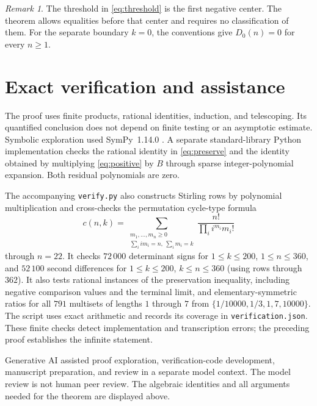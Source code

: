 \documentclass[11pt,a4paper]{article}
\theoremstyle{remark}
\newtheorem{remark}[theorem]{Remark}
\begin{document}
\begin{remark}
The threshold in \eqref{eq:threshold} is the first negative center.
The theorem allows equalities before that center and requires no
classification of them. For the separate boundary $k=0$, the conventions
give $D_0(n)=0$ for every $n\geq1$.
\end{remark}

\section{Exact verification and assistance}

The proof uses finite products, rational identities, induction, and
telescoping. Its quantified conclusion does not depend on finite testing
or an asymptotic estimate. Symbolic exploration used SymPy~1.14.0
\cite{MeurerEtAl2017}. A separate standard-library Python implementation
checks the rational identity in \eqref{eq:preserve} and the identity obtained by multiplying
\eqref{eq:positive} by $B$ through sparse integer-polynomial expansion.
Both residual polynomials are zero.

The accompanying \texttt{verify.py} also constructs Stirling rows by
polynomial multiplication and cross-checks the permutation cycle-type
formula
\[
 c(n,k)=\sum_{\substack{m_1,\ldots,m_n\geq0\\
                  \sum_i i m_i=n,\ \sum_i m_i=k}}
           \frac{n!}{\prod_i i^{m_i}m_i!}
\]
through $n=22$. It checks $72\,000$ determinant signs for
$1\leq k\leq200$, $1\leq n\leq360$, and $52\,100$ second differences
for $1\leq k\leq200$, $k\leq n\leq360$ (using rows through $362$).
It also tests rational instances of the preservation inequality, including
negative comparison values and the terminal limit, and elementary-symmetric
ratios for all $791$ multisets of lengths $1$ through $7$ from
$\{1/10000,1/3,1,7,10000\}$. The script uses exact arithmetic and records
its coverage in \texttt{verification.json}. These finite checks detect
implementation and transcription errors; the preceding proof establishes
the infinite statement.

Generative AI assisted proof exploration, verification-code development,
manuscript preparation, and review in a separate model context. The model
review is not human peer review. The algebraic identities and all arguments
needed for the theorem are displayed above.



\end{document}
